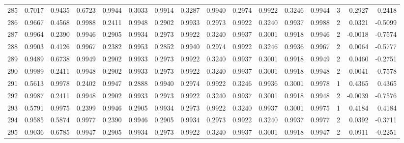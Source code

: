 \begin{tabular}{lrrrrrrrrrrrrrrr}
285 &      0.7017 &  0.9435 &  0.6723 &  0.9944 &  0.3033 &  0.9914 &  0.3287 &  0.9940 &  0.2974 &  0.9922 &   0.3246 &     0.9944 &      3 &                    0.2927 &                     0.2418 \\
286 &      0.9667 &  0.4568 &  0.9988 &  0.2411 &  0.9948 &  0.2902 &  0.9933 &  0.2973 &  0.9922 &  0.3240 &   0.9937 &     0.9988 &      2 &                    0.0321 &                    -0.5099 \\
287 &      0.9964 &  0.2390 &  0.9946 &  0.2905 &  0.9934 &  0.2973 &  0.9922 &  0.3240 &  0.9937 &  0.3001 &   0.9918 &     0.9946 &      2 &                   -0.0018 &                    -0.7574 \\
288 &      0.9903 &  0.4126 &  0.9967 &  0.2382 &  0.9953 &  0.2852 &  0.9940 &  0.2974 &  0.9922 &  0.3246 &   0.9936 &     0.9967 &      2 &                    0.0064 &                    -0.5777 \\
289 &      0.9489 &  0.6738 &  0.9949 &  0.2902 &  0.9933 &  0.2973 &  0.9922 &  0.3240 &  0.9937 &  0.3001 &   0.9918 &     0.9949 &      2 &                    0.0460 &                    -0.2751 \\
290 &      0.9989 &  0.2411 &  0.9948 &  0.2902 &  0.9933 &  0.2973 &  0.9922 &  0.3240 &  0.9937 &  0.3001 &   0.9918 &     0.9948 &      2 &                   -0.0041 &                    -0.7578 \\
291 &      0.5613 &  0.9978 &  0.2402 &  0.9947 &  0.2888 &  0.9940 &  0.2974 &  0.9922 &  0.3246 &  0.9936 &   0.3001 &     0.9978 &      1 &                    0.4365 &                     0.4365 \\
292 &      0.9987 &  0.2411 &  0.9948 &  0.2902 &  0.9933 &  0.2973 &  0.9922 &  0.3240 &  0.9937 &  0.3001 &   0.9918 &     0.9948 &      2 &                   -0.0039 &                    -0.7576 \\
293 &      0.5791 &  0.9975 &  0.2399 &  0.9946 &  0.2905 &  0.9934 &  0.2973 &  0.9922 &  0.3240 &  0.9937 &   0.3001 &     0.9975 &      1 &                    0.4184 &                     0.4184 \\
294 &      0.9585 &  0.5874 &  0.9977 &  0.2390 &  0.9946 &  0.2905 &  0.9934 &  0.2973 &  0.9922 &  0.3240 &   0.9937 &     0.9977 &      2 &                    0.0392 &                    -0.3711 \\
295 &      0.9036 &  0.6785 &  0.9947 &  0.2905 &  0.9934 &  0.2973 &  0.9922 &  0.3240 &  0.9937 &  0.3001 &   0.9918 &     0.9947 &      2 &                    0.0911 &                    -0.2251 \\

\end{tabular}
